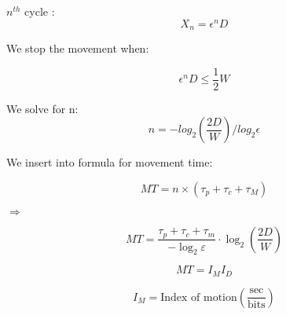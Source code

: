 $n^{th}$ cycle :
$$X_n = \epsilon^n D $$

We stop the movement when:

$$\epsilon^n D \leq \frac{1}{2} W$$

We solve for n:
$$ n = -log_2(\frac{2D}{W})/log_2\epsilon$$

We insert into formula for movement time: 

$$MT = n \times (\tau_p + \tau_c + \tau_M)$$

$\Rightarrow$

$$ MT = \frac{\tau_p + \tau_c + \tau_m}{-\log_{2} \varepsilon} \cdot \log_{2} \left( \frac{2D}{W} \right) $$

$$ MT = I_M I_D $$

$$ I_M = \text{Index of motion} \left( \frac{\text{sec}}{\text{bits}} \right) $$

























